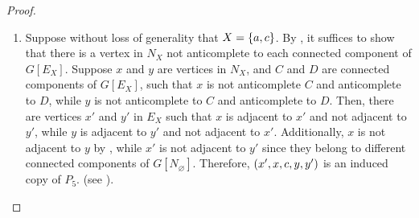 \begin{proof}
\begin{enumerate}[label=(\roman*)]
\begin{figure}[htb!]
                \caption{An induced copy of $C_4$ with a nonempty 3-bag given
                    that non-isolated vertices in $N_Y$ are not anticomplete to
                    $N_{X}$.}
                \label{fig:3_bags_empty_2}
            \end{figure}
        
        \item Suppose without loss of generality that $X=\left\{a,c\right\}$. By
            , it suffices to show that there is a vertex in
            $N_X$ not anticomplete to each connected component of $G[E_X]$.
            Suppose $x$ and $y$ are vertices in $N_X$, and $C$ and $D$ are
            connected components of $G[E_X]$, such that $x$ is not anticomplete
            $C$ and anticomplete to $D$, while $y$ is not anticomplete to $C$
            and anticomplete to $D$. Then, there are vertices $x'$ and $y'$ in
            $E_X$ such that $x$ is adjacent to $x'$ and not adjacent to $y'$,
            while $y$ is adjacent to $y'$ and not adjacent to $x'$.
            Additionally, $x$ is not adjacent to $y$ by ,
            while $x'$ is not adjacent to $y'$ since they belong to different
            connected components of $G[N_\varnothing]$. Therefore,
            $\left(x',x,c,y,y'\right)$ is an induced copy of $P_5$. (see
            ).
            
            \begin{figure}[htb!]
                \centering
\end{figure}
\end{enumerate}
\end{proof}
